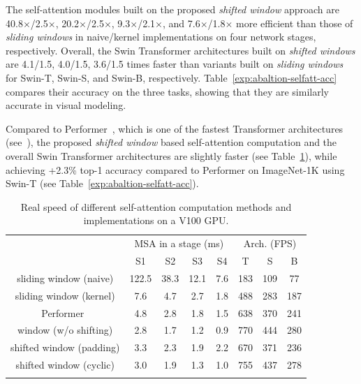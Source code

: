 \documentclass[10pt,twocolumn,letterpaper]{article}
\begin{document}
The self-attention modules built on the proposed \emph{shifted window} approach are 40.8$\times$/2.5$\times$, 20.2$\times$/2.5$\times$, 9.3$\times$/2.1$\times$, and 7.6$\times$/1.8$\times$ more efficient than those of \emph{sliding windows} in naive/kernel implementations on four network stages, respectively. Overall, the Swin Transformer architectures built on \emph{shifted windows} are 4.1/1.5, 4.0/1.5, 3.6/1.5 times faster than variants built on \emph{sliding windows} for Swin-T, Swin-S, and Swin-B, respectively. Table~\ref{exp:abaltion-selfatt-acc} compares their accuracy on the three tasks, showing that they are similarly accurate in visual modeling.

Compared to Performer~\cite{choromanski2020performer}, which is one of the fastest Transformer architectures (see~\cite{tay2020long}), the proposed \emph{shifted window} based self-attention computation and the overall Swin Transformer architectures are slightly faster (see Table~\ref{tab:ablation-selfatt-efficient}), while achieving +2.3\% top-1 accuracy compared to Performer on ImageNet-1K using Swin-T (see Table~\ref{exp:abaltion-selfatt-acc}).


\begin{table}[]
    \centering
\small
\addtolength{\tabcolsep}{-4.0pt}
\begin{tabular}{c|cccc|ccc}
\Xhline{1.0pt}
\multirow{2}{*}{method} & \multicolumn{4}{c|}{MSA in a stage (ms)} & \multicolumn{3}{c}{Arch. (FPS)} \\
& S1 & S2 & S3 & S4 & T & S & B \\
\hline
sliding window (naive) & 122.5 & 38.3 & 12.1 & 7.6 & 183 & 109 & 77 \\
sliding window (kernel)  & 7.6 & 4.7 & 2.7 & 1.8 & 488 & 283 & 187 \\
\hline
Performer~\cite{choromanski2020performer} & 4.8 & 2.8 & 1.8 & 1.5 & 638 & 370 & 241 \\
\hline
window (w/o shifting) & 2.8 & 1.7 & 1.2 & 0.9 & 770 & 444 & 280 \\
\hline
shifted window (padding) & 3.3 & 2.3 & 1.9 & 2.2 & 670 & 371 & 236 \\
shifted window (cyclic)  & 3.0 & 1.9 & 1.3 & 1.0 & 755 & 437 & 278 \\
\Xhline{1.0pt}
\end{tabular}
    \caption{Real speed of different self-attention computation methods and implementations on a V100 GPU. }
    \label{tab:ablation-selfatt-efficient}
\normalsize
\end{table}
\end{document}
